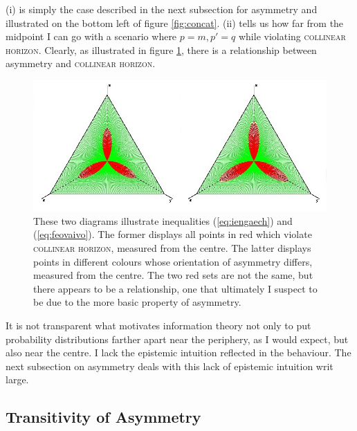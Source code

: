 \documentclass[smallextended]{svjour3}       %
\begin{document}
(i) is simply the case described in the next subsection for asymmetry
and illustrated on the bottom left of figure \ref{fig:concat}. (ii)
tells us how far from the midpoint I can go with a scenario where
$p=m,p'=q$ while violating \textsc{collinear horizon}. Clearly, as
illustrated in figure \ref{fig:eeghoomo}, there is a relationship
between asymmetry and \textsc{collinear horizon}. 

\begin{figure}[ht]
  \begin{flushright}
    \begin{minipage}[h]{\linewidth}
     \includegraphics[width=\textwidth]{fleur-concat-edited.png}
      \caption{\footnotesize These two diagrams illustrate
        inequalities (\ref{eq:iengaech}) and (\ref{eq:feovaivo}). The
        former displays all points in red which violate
        \textsc{collinear horizon}, measured from the centre. The
        latter displays points in different colours whose orientation
        of asymmetry differs, measured from the centre. The two red
        sets are not the same, but there appears to be a relationship,
        one that ultimately I suspect to be due to the more basic
        property of asymmetry.}
      \label{fig:eeghoomo}
    \end{minipage}
  \end{flushright}
\end{figure}

It is not transparent what motivates information theory not only to
put probability distributions farther apart near the periphery, as I
would expect, but also near the centre. I lack the epistemic intuition
reflected in the behaviour. The next subsection on asymmetry deals
with this lack of epistemic intuition writ large.

\subsection{Transitivity of Asymmetry}
\label{subsec:Asymmetry}
\end{document}
